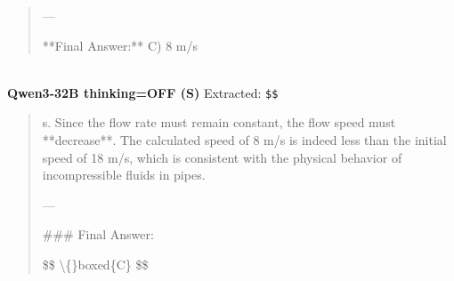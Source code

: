 \begin{tcolorbox}[
  colback=gray!5, colframe=gray!40,
  title={\textbf{Example 6: Reasoning Mode Helps (Source Domain Only)}},
  fonttitle=\small\bfseries, breakable]
\begin{quote}
---

**Final Answer:** C) 8 m/s\end{quote}
\\[-2pt]
\textbf{Qwen3-32B thinking=OFF (S)} \textcolor{red}{\xmark} Extracted: \texttt{\$\$}
\begin{quote}\scriptsize\ttfamily [...] s. Since the flow rate must remain constant, the flow speed must **decrease**. The calculated speed of 8 m/s is indeed less than the initial speed of 18 m/s, which is consistent with the physical behavior of incompressible fluids in pipes.

---

\#\#\# Final Answer:

\$\$
\textbackslash\{\}boxed\{C\}
\$\$\end{quote}
\\[-2pt]
\end{tcolorbox}
\vspace{8pt}
